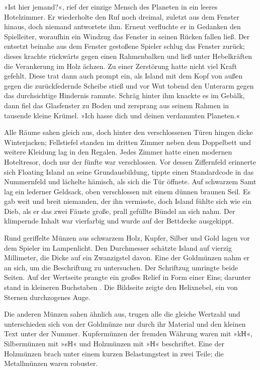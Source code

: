 »Ist hier jemand?«, rief der einzige Mensch des Planeten in ein leeres Hotelzimmer. Er wiederholte den Ruf noch dreimal, zuletzt aus dem Fenster hinaus, doch niemand antwortete ihm. Erneut verfluchte er in Gedanken den Spielleiter, woraufhin ein Windzug das Fenster in seinen Rücken fallen ließ. Der entsetzt beinahe aus dem Fenster gestoßene Spieler schlug das Fenster zurück; dieses krachte rückwärts gegen einen Rahmenbalken und ließ unter Hebelkräften die Verankerung im Holz ächzen. Zu einer Zerstörung hatte nicht viel Kraft gefehlt. Diese trat dann auch prompt ein, als Island mit dem Kopf von außen gegen die zurückfedernde Scheibe stieß und vor Wut tobend den Unterarm gegen das durchsichtige Hindernis rammte. Schräg hinter ihm knackte es im Gebälk, dann fiel das Glasfenster zu Boden und zersprang aus seinem Rahmen in tausende kleine Krümel. »Ich hasse dich und deinen verdammten Planeten.«

Alle Räume sahen gleich aus, doch hinter den verschlossenen Türen hingen dicke Winterjacken; Fellstiefel standen im dritten Zimmer neben dem Doppelbett und weitere Kleidung lag in den Regalen. Jedes Zimmer hatte einen modernen Hoteltresor, doch nur der fünfte war verschlossen. Vor dessen Ziffernfeld erinnerte sich Floating Island an seine Grundausbildung, tippte einen Standardcode in das Nummernfeld und lächelte hämisch, als sich die Tür öffnete. Auf schwarzem Samt lag ein lederner Geldsack, oben verschlossen mit einem dünnen braunen Seil. Es gab weit und breit niemanden, der ihn vermisste, doch Island fühlte sich wie ein Dieb, als er das zwei Fäuste große, prall gefüllte Bündel an sich nahm. Der klimpernde Inhalt war vierfarbig und wurde auf der Bettdecke ausgekippt.

Rund geriffelte Münzen aus schwarzem Holz, Kupfer, Silber und Gold lagen vor dem Spieler im Lampenlicht. Den Durchmesser schätzte Island auf vierzig Millimeter, die Dicke auf ein Zwanzigstel davon. Eine der Goldmünzen nahm er an sich, um die Beschriftung zu untersuchen. Der Schriftzug  umringte beide Seiten. Auf der Wertseite prangte ein großes Relief in Form einer Eins; darunter stand in kleineren Buchstaben . Die Bildseite zeigte den Helixnebel, ein von Sternen durchzogenes Auge.

Die anderen Münzen sahen ähnlich aus, trugen alle die gleiche Wertzahl und unterschieden sich von der Goldmünze nur durch ihr Material und den kleinen Text unter der Nummer. Kupfermünzen der fremden Währung waren mit »kℍ«, Silbermünzen mit »sℍ« und Holzmünzen mit »ℍ« beschriftet. Eine der Holzmünzen brach unter einem kurzen Belastungstest in zwei Teile; die Metallmünzen waren robuster.

